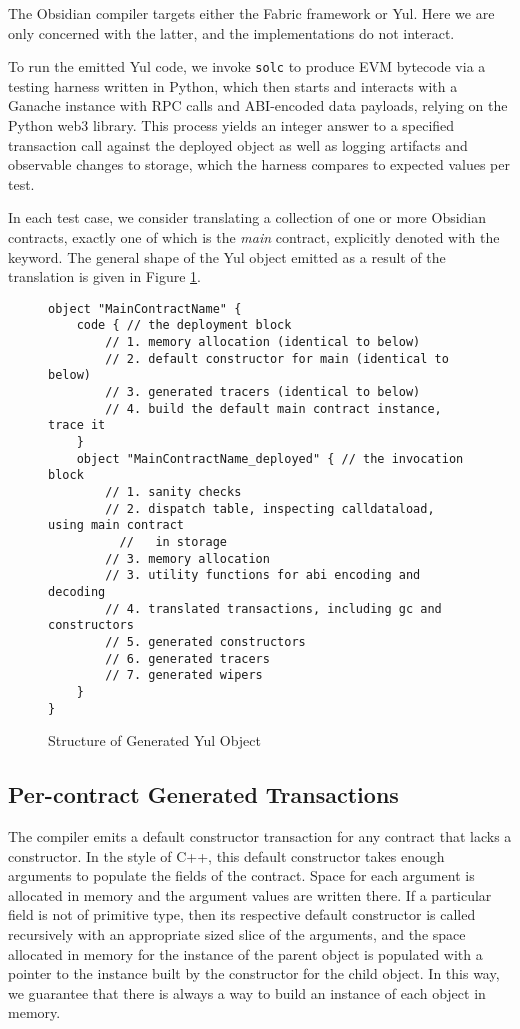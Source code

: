 The Obsidian compiler targets either the Fabric framework or Yul. Here we
are only concerned with the latter, and the implementations do not
interact.

To run the emitted Yul code, we invoke \texttt{solc} to produce EVM
bytecode via a testing harness written in Python, which then starts and
interacts with a Ganache instance with RPC calls and ABI-encoded data
payloads, relying on the Python web3 library. This process yields an
integer answer to a specified transaction call against the deployed object
as well as logging artifacts and observable changes to storage, which the
harness compares to expected values per test.

In each test case, we consider translating a collection of one or more
Obsidian contracts, exactly one of which is the \emph{main} contract,
explicitly denoted with the  keyword. The general shape of the
Yul object emitted as a result of the translation is given in
Figure \ref{code.1}.

\begin{figure}[hbtp]
    \caption{Structure of Generated Yul Object}
    \label{code.1}
    \begin{lstlisting}[language=yul,frame=single]
object "MainContractName" {
    code { // the deployment block
        // 1. memory allocation (identical to below)
        // 2. default constructor for main (identical to below)
        // 3. generated tracers (identical to below)
        // 4. build the default main contract instance, trace it
    }
    object "MainContractName_deployed" { // the invocation block
        // 1. sanity checks
        // 2. dispatch table, inspecting calldataload, using main contract
          //   in storage
        // 3. memory allocation
        // 3. utility functions for abi encoding and decoding
        // 4. translated transactions, including gc and constructors
        // 5. generated constructors
        // 6. generated tracers
        // 7. generated wipers
    }
}
    \end{lstlisting}
\end{figure}

\subsection{Per-contract Generated Transactions}

The compiler emits a default constructor transaction for any contract that
lacks a constructor. In the style of C++, this default constructor takes
enough arguments to populate the fields of the contract. \cite{TODO} Space
for each argument is allocated in memory and the argument values are
written there. If a particular field is not of primitive type, then its
respective default constructor is called recursively with an appropriate
sized slice of the arguments, and the space allocated in memory for the
instance of the parent object is populated with a pointer to the instance
built by the constructor for the child object. In this way, we guarantee
that there is always a way to build an instance of each object in memory.


